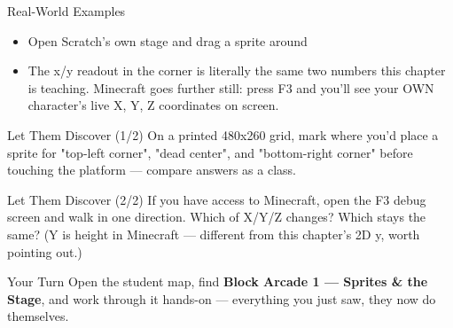 \documentclass[aspectratio=169]{beamer}
\begin{document}
\begin{frame}{Real-World Examples}
    \large
    \begin{itemize}
        \item Open Scratch's own stage and drag a sprite around
        \item The x/y readout in the corner is literally the same two numbers this chapter is teaching. Minecraft goes further still: press F3 and you'll see your OWN character's live X, Y, Z coordinates on screen.
    \end{itemize}
\end{frame}


\begin{frame}{Let Them Discover (1/2)}
    \Large
    On a printed 480x260 grid, mark where you'd place a sprite for "top-left corner", "dead center", and "bottom-right corner" before touching the platform — compare answers as a class.
\end{frame}


\begin{frame}{Let Them Discover (2/2)}
    \Large
    If you have access to Minecraft, open the F3 debug screen and walk in one direction. Which of X/Y/Z changes? Which stays the same? (Y is height in Minecraft — different from this chapter's 2D y, worth pointing out.)
\end{frame}

\begin{frame}{Your Turn}
    \Large
    Open the student map, find \textbf{Block Arcade 1 — Sprites \& the Stage}, and work through it
    hands-on --- everything you just saw, they now do themselves.
\end{frame}
\end{document}
